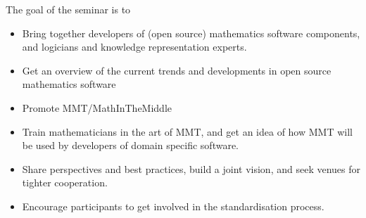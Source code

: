 The goal of the seminar is to 
\begin{itemize}
\item Bring together developers of (open source) mathematics software
  components, and logicians and knowledge representation experts.
\item Get an overview of the current trends and developments in open source
  mathematics software
\item Promote MMT/MathInTheMiddle
\item Train mathematicians in the art of MMT, and get an idea of how MMT will be
  used by developers of domain specific software.
\item Share perspectives and best practices, build a joint vision, and
  seek venues for tighter cooperation.
\item Encourage participants to get involved in the standardisation process.
\end{itemize}





